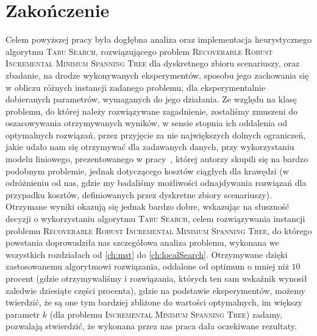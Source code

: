 \chapter{Zakończenie}
\thispagestyle{chapterBeginStyle}

Celem powyższej pracy była dogłębna analiza oraz implementacja heurystycznego algorytmu \textsc{Tabu Search}, rozwiązującego problem \textsc{Recoverable Robust Incremental Minimum Spanning Tree} dla dyskretnego zbioru scenariuszy, oraz zbadanie, na drodze wykonywanych eksperymentów, sposobu jego zachowania się w obliczu różnych instancji zadanego problemu, dla eksperymentalnie dobieranych parametrów, wymaganych do jego działania. Ze względu na klasę problemu, do której należy rozwiązywane zagadnienie, zostaliśmy zmuszeni do oszacowywania otrzymywanych wyników, w sensie stopnia ich oddalenia od optymalnych rozwiązań, przez przyjęcie za nie największych dolnych ograniczeń, jakie udało nam się otrzymywać dla zadawanych danych, przy wykorzystaniu modelu liniowego, prezentowanego w pracy~\cite{DBLP:journals/corr/HradovichKZ16}, której autorzy skupili się na bardzo podobnym problemie, jednak dotyczącego kosztów ciągłych dla krawędzi (w odróżnieniu od nas, gdzie my badaliśmy możliwości odnajdywania rozwiązań dla przypadku kosztów, definiowanych przez dyskretne zbiory scenariuszy). Otrzymane wyniki okazują się jednak bardzo dobre, wskazując na słuszność decyzji o wykorzystaniu algorytmu \textsc{Tabu Search}, celem rozwiązywania instancji problemu \textsc{Recoverable Robust Incremental Minimum Spanning Tree}, do którego powstania doprowadziła nas szczegółowa analiza problemu, wykonana we wszystkich rozdziałach od \ref{ch:mst} do \ref{ch:localSearch}. Otrzymywane dzięki zastosowanemu algorytmowi rozwiązania, oddalone od optimum o mniej niż $10$ procent (gdzie otrzymywaliśmy i rozwiązania, których ten sam wskaźnik wynosił zaledwie dziesiąte części procenta), gdzie na podstawie eksperymentów, możemy twierdzić, że są one tym bardziej zbliżone do wartości optymalnych, im większy parametr $k$ (dla problemu \textsc{Incremental Minimum Spanning Tree}) zadamy, pozwalają stwierdzić, że wykonana przez nas praca dała oczekiwane rezultaty.